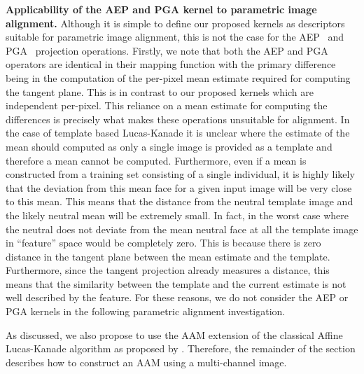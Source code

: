 \textbf{Applicability of the AEP and PGA kernel to parametric image alignment.}
Although it is simple to define our proposed kernels as descriptors suitable
for parametric image alignment, this is not the case for the
AEP~\cite{smith2006recovering} and PGA~\cite{smith2008facial} projection
operations. Firstly, we note that both the AEP and PGA operators are identical
in their mapping function with the primary difference being in the computation
of the per-pixel mean estimate required for computing the tangent plane. This
is in contrast to our proposed kernels which are independent per-pixel. This
reliance on a mean estimate for computing the differences is precisely what
makes these operations unsuitable for alignment. In the case of template based
Lucas-Kanade it is unclear where the estimate of the mean should computed as
only a single image is provided as a template and therefore a mean cannot
be computed. Furthermore, even if a mean is constructed from a training set
consisting of a single individual, it is highly likely that the deviation
from this mean face for a given input image will be very close to this mean. This
means that the distance from the neutral template image and the likely neutral
mean will be extremely small. In fact, in the worst case where the neutral does
not deviate from the mean neutral face at all the template image in ``feature''
space would be completely zero. This is because there is zero distance in
the tangent plane between the mean estimate and the template. Furthermore,
since the tangent projection already measures a distance, this means that
the similarity between the template and the current estimate is not well
described by the feature. For these reasons, we do not consider the AEP or PGA
kernels in the following parametric alignment investigation.

As discussed, we also propose to use the AAM extension of the classical
Affine Lucas-Kanade algorithm as proposed by \citet{matthews2004active}.
Therefore, the remainder of the section describes how to construct an AAM
using a multi-channel image.
